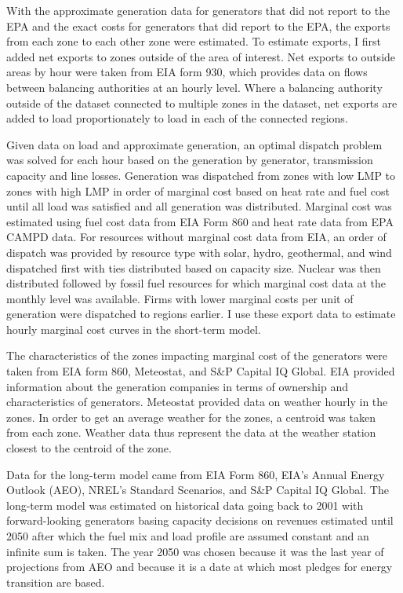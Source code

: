 \documentclass[12pt]{article}
\begin{document}
With the approximate generation data for generators that did not report to the EPA and the exact costs for generators that did report to the EPA, the exports from each zone to each other zone were estimated. To estimate exports, I first added net exports to zones outside of the area of interest. Net exports to outside areas by hour were taken from EIA form 930, which provides data on flows between balancing authorities at an hourly level. Where a balancing authority outside of the dataset connected to multiple zones in the dataset, net exports are added to load proportionately to load in each of the connected regions. 

Given data on load and approximate generation, an optimal dispatch problem was solved for each hour based on the generation by generator, transmission capacity and line losses. Generation was dispatched from zones with low LMP to zones with high LMP in order of marginal cost based on heat rate and fuel cost until all load was satisfied and all generation was distributed. Marginal cost was estimated using fuel cost data from EIA Form 860 and heat rate data from EPA CAMPD data. For resources without marginal cost data from EIA, an order of dispatch was provided by resource type with solar, hydro, geothermal, and wind dispatched first with ties distributed based on capacity size. Nuclear was then distributed followed by fossil fuel resources for which marginal cost data at the monthly level was available. Firms with lower marginal costs per unit of generation were dispatched to regions earlier. I use these export data to estimate hourly marginal cost curves in the short-term model.

The characteristics of the zones impacting marginal cost of the generators were taken from EIA form 860, Meteostat, and S\&P Capital IQ Global. EIA provided information about the generation companies in terms of ownership and characteristics of generators. Meteostat provided data on weather hourly in the zones. In order to get an average weather for the zones, a centroid was taken from each zone. Weather data thus represent the data at the weather station closest to the centroid of the zone.

Data for the long-term model came from EIA Form 860, EIA's Annual Energy Outlook (AEO), NREL's Standard Scenarios, and S\&P Capital IQ Global. The long-term model was estimated on historical data going back to 2001 with forward-looking generators basing capacity decisions on revenues estimated until 2050 after which the fuel mix and load profile are assumed constant and an infinite sum is taken. The year 2050 was chosen because it was the last year of projections from AEO and because it is a date at which most pledges for energy transition are based.
\end{document}
